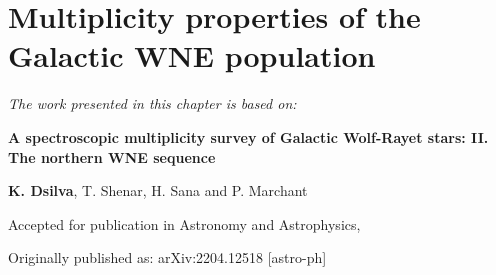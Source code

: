 \chapter{Multiplicity properties of the Galactic WNE population}\label{ch:wne}

\textit{The work presented in this chapter is based on:}

\textbf{A spectroscopic multiplicity survey of Galactic Wolf-Rayet stars: II. The northern WNE sequence}

\textbf{K. Dsilva}, T. Shenar, H. Sana and P. Marchant

Accepted for publication in {\sc Astronomy and Astrophysics},

Originally published as: \newline
arXiv:2204.12518 [astro-ph]

